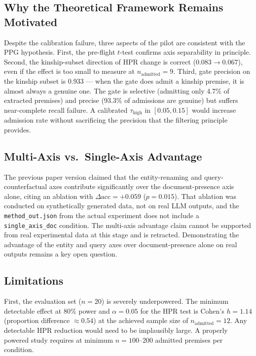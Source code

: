 \documentclass[11pt,letterpaper]{article}
\begin{document}
\subsection{Why the Theoretical Framework Remains Motivated}

Despite the calibration failure, three aspects of the pilot are consistent with the PPG hypothesis. First, the pre-flight $t$-test confirms axis separability in principle. Second, the kinship-subset direction of HPR change is correct ($0.083 \to 0.067$), even if the effect is too small to measure at $n_{\mathrm{admitted}}=9$. Third, gate precision on the kinship subset is 0.933 --- when the gate does admit a kinship premise, it is almost always a genuine one. The gate is selective (admitting only 4.7\% of extracted premises) and precise (93.3\% of admissions are genuine) but suffers near-complete recall failure. A calibrated $\tau_{\mathrm{high}}$ in $[0.05, 0.15]$ would increase admission rate without sacrificing the precision that the filtering principle provides.

\subsection{Multi-Axis vs.\ Single-Axis Advantage}

The previous paper version claimed that the entity-renaming and query-counterfactual axes contribute significantly over the document-presence axis alone, citing an ablation with $\Delta\mathrm{acc}=+0.059$ ($p=0.015$). That ablation was conducted on synthetically generated data, not on real LLM outputs, and the \texttt{method\_out.json} from the actual experiment does not include a \texttt{single\_axis\_doc} condition. The multi-axis advantage claim cannot be supported from real experimental data at this stage and is retracted. Demonstrating the advantage of the entity and query axes over document-presence alone on real outputs remains a key open question.

\subsection{Limitations}

First, the evaluation set ($n=20$) is severely underpowered. The minimum detectable effect at 80\% power and $\alpha=0.05$ for the HPR test is Cohen's $h=1.14$ (proportion difference $\approx0.54$) at the achieved sample size of $n_{\mathrm{admitted}}=12$. Any detectable HPR reduction would need to be implausibly large. A properly powered study requires at minimum $n=100$--200 admitted premises per condition.
\end{document}
